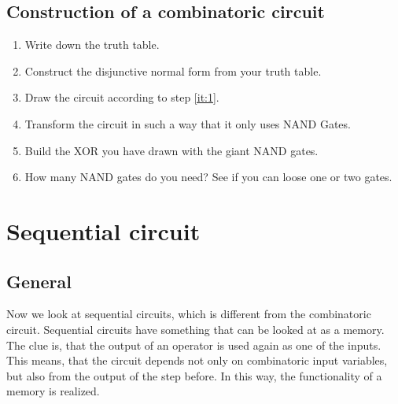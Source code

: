 \documentclass[10pt,a4paper]{article}
\begin{document}
\subsection{Construction of a combinatoric circuit}
\begin{enumerate}
	\item Write down the truth table.
	\item\label{it:1} Construct the disjunctive normal form from your truth table.
	\item Draw the circuit according to step \ref{it:1}.
	\item Transform the circuit in such a way that it only uses NAND Gates.
	\item Build the XOR you have drawn with the giant NAND gates.
	\item How many NAND gates do you need? See if you can loose one or two gates.
\end{enumerate}



                                                       
\section{Sequential circuit}                           
\subsection{General}
Now we look at sequential circuits, which is different from the combinatoric circuit. Sequential circuits have something that can be looked at as a memory. The clue is, that the output of an operator is used again as one of the inputs. This means, that the circuit depends not only on combinatoric input variables, but also from the output of the step before. In this way, the functionality of a memory is realized. 
\end{document}
